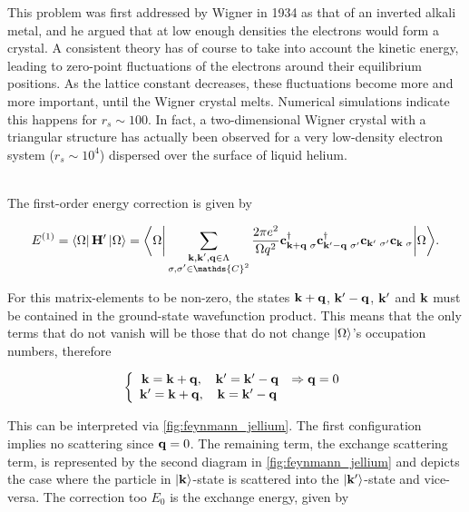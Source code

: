 \documentclass{homework}
\begin{document}
\begin{tcolorbox}[colback = LimeGreen, title = Historical Context]

This problem was first addressed by Wigner in 1934 as that of an inverted alkali metal, and he argued that at low enough densities the electrons would form a crystal. A consistent theory has of course to take into account the kinetic energy, leading to zero-point fluctuations of the electrons around their equilibrium positions. As the lattice constant decreases, these fluctuations become more and more important, until the Wigner crystal melts. Numerical simulations indicate this happens for $r_s \sim 100$. In fact, a two-dimensional Wigner crystal with a triangular structure has actually been observed for a very low-density electron system ($r_s\sim 10^4$) dispersed over the surface of liquid helium. 

\end{tcolorbox}

\blanky \\

The first-order energy correction is given by 

$$
    E^{(1)} = \bra{\Omega} {{\bf H}}' \ket{\Omega} = \bigg \langle {\Omega} \bigg|  \sum_{\substack{{\bf k},{\bf k}',{\bf q} \in \Lambda\\
    \sigma, \sigma' \in \mathds{C}^2}} \frac{2\pi e^2}{\Omega q^2} {\bf c}_{{\bf k}+{\bf q} \blanky \sigma}^\dagger {\bf c}_{{\bf k}'-{\bf q} \blanky \sigma'}^\dagger {\bf c}_{{\bf k}' \blanky \sigma'} {\bf c}_{{\bf k} \blanky \sigma} \bigg| {\Omega} \bigg \rangle.
$$

For this matrix-elements to be non-zero, the states ${\bf k}+{\bf q}$, ${\bf k}'-{\bf q}$, ${\bf k}'$ and ${\bf k}$ must be contained in the ground-state wavefunction product. This means that the only terms that do not vanish will be those that do not change $\ket{\Omega}$'s occupation numbers, therefore

\begin{equation}
    \left\{\begin{array}{ccc}
        {\bf k} = {\bf k} + {\bf q,} & {\bf k}' = {\bf k}' - {\bf q} & \Rightarrow {\bf q} = 0 \\
        {\bf k}' = {\bf k} + {\bf q}, & {\bf k} = {\bf k}' - {\bf q}
    \end{array} \right.
\end{equation}

This can be interpreted via \cref{fig:feynmann_jellium}. The first configuration implies no scattering since ${\bf q} = 0$. The remaining term, the exchange scattering term, is represented by the second diagram in \cref{fig:feynmann_jellium} and depicts the case where the particle in $\ket{{\bf k}}$-state is scattered into the $\ket{{\bf k}'}$-state and vice-versa. The correction too $E_0$ is the exchange energy, given by 
\end{document}

